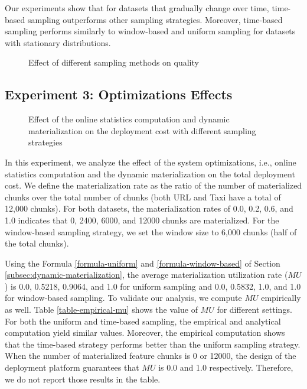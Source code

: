 Our experiments show that for datasets that gradually change over time, time-based sampling outperforms other sampling strategies.
Moreover, time-based sampling performs similarly to window-based and uniform sampling for datasets with stationary distributions.

\begin{figure}[!h]
\centering
\resizebox{\columnwidth}{!}{}
\caption{Effect of different sampling methods on quality}
 \vspace{-20pt}
\label{sampling-method-figure}
\end{figure}

\subsection{Experiment 3: Optimizations Effects}
\begin{figure}[!h]
\centering
\resizebox{\columnwidth}{!}{}
\caption{Effect of the online statistics computation and dynamic materialization on the deployment cost with different sampling strategies}
\label{fig-optimization-effect}
\end{figure}
In this experiment, we analyze the effect of the system optimizations, i.e., online statistics computation and the dynamic materialization on the total deployment cost.
We define the materialization rate as the ratio of the number of materialized chunks over the total number of chunks (both URL and Taxi have a total of 12,000 chunks).
For both datasets, the materialization rates of 0.0, 0.2, 0.6, and 1.0 indicates that 0, 2400, 6000, and 12000 chunks are materialized.
For the window-based sampling strategy, we set the window size to 6,000 chunks (half of the total chunks).

Using the Formula \ref{formula-uniform} and \ref{formula-window-based} of Section \ref{subsec:dynamic-materialization}, the average materialization utilization rate ($MU$) is 0.0, 0.5218, 0.9064, and 1.0 for uniform sampling and 0.0, 0.5832, 1.0, and 1.0 for window-based sampling.
To validate our analysis, we compute $MU$ empirically as well.
Table \ref{table-empirical-mu} shows the value of $MU$ for different settings.
For both the uniform and time-based sampling, the empirical and analytical computation yield similar values.
Moreover, the empirical computation shows that the time-based strategy performs better than the uniform sampling strategy.
When the number of materialized feature chunks is 0 or 12000, the design of the deployment platform guarantees that $MU$ is 0.0 and 1.0 respectively. 
Therefore, we do not report those results in the table.

